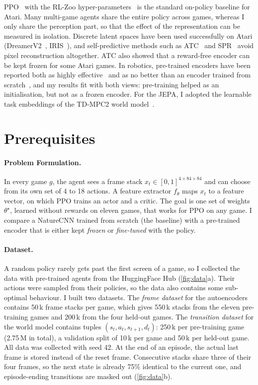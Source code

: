 \documentclass[runningheads]{llncs}
\begin{document}
PPO~\cite{schulman2017ppo} with the RL-Zoo hyper-parameters~\cite{raffin2020zoo} is the
standard on-policy baseline for Atari. Many multi-game agents share the entire policy across games, whereas I only share the
perception part, so that the effect of the representation can be measured in isolation. Discrete latent spaces have been used
successfully on Atari (DreamerV2~\cite{hafner2021dreamerv2}, IRIS~\cite{micheli2023iris}), and
self-predictive methods such as ATC~\cite{stooke2021atc} and SPR~\cite{schwarzer2021spr} avoid
pixel reconstruction altogether. ATC also showed that a reward-free encoder can be kept frozen for some Atari games. In robotics, pre-trained encoders have been reported both
as highly effective~\cite{parisi2022pvr} and as no better than an encoder trained from
scratch~\cite{hansen2022pretrained}, and my results fit with both views: pre-training helped
as an initialisation, but not as a frozen encoder. For the JEPA, I
adopted the learnable task embeddings of the TD-MPC2 world model~\cite{hansen2024tdmpc2}.

\section{Prerequisites}
\label{sec:prereq}

\paragraph{Problem Formulation.} In every game $g$, the agent sees a frame stack
$x_t\in[0,1]^{4\times84\times84}$ and can choose from its own set of 4 to 18 actions. A feature
extractor $f_\theta$ maps $x_t$ to a feature vector, on which PPO trains an actor and a critic.
The goal is one set of weights $\theta^\star$, learned without rewards on eleven games, that
works for PPO on any game. I compare a NatureCNN trained from scratch (the baseline) with a
pre-trained encoder that is either kept \emph{frozen} or \emph{fine-tuned} with the policy.

\paragraph{Dataset.} A random policy rarely gets past the first screen of a game, so I
collected the data with pre-trained agents from the HuggingFace Hub (\cref{fig:data}a). Their actions were sampled from their policies, so the data also contains some sub-optimal
behaviour. I built two datasets. The \emph{frame dataset} for the
autoencoders contains 50\,k frame stacks per game, which gives 550\,k stacks from the eleven
pre-training games and 200\,k from the four held-out games. The \emph{transition dataset} for
the world model contains tuples $(s_t,a_t,s_{t+1},d_t)$: 250\,k per pre-training game (2.75\,M in
total), a validation split of 10\,k per game and 50\,k per held-out game. All data was
collected with seed 42. At the end of an episode, the actual last frame is stored instead of the reset frame.
Consecutive stacks share three of their four frames, so the next state is already 75\%
identical to the current one, and episode-ending transitions are masked out (\cref{fig:data}b).
\end{document}
